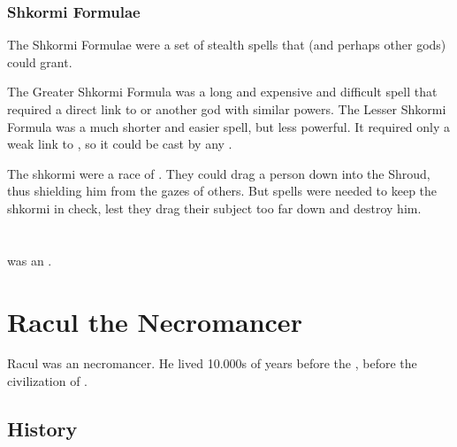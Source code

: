 \subsubsection{Shkormi Formulae}
The Shkormi Formulae were a set of stealth spells that \Nasshikerr (and perhaps other gods) could grant. 

The Greater Shkormi Formula was a long and expensive and difficult spell that required a direct link to \Nasshikerr or another god with similar powers.
The Lesser Shkormi Formula was a much shorter and easier spell, but less powerful. 
It required only a weak link to \Nasshikerr, so it could be cast by any \rethyax.

The shkormi were a race of \daemons.
They could drag a person down into the Shroud, thus shielding him from the gazes of others. 
But spells were needed to keep the shkormi in check, lest they drag their subject too far down and destroy him. 















\section{\NathRamos}
\index{\NathRamos}
\NathRamos was an \ophidian.















\section{Racul the Necromancer}
Racul was an \ophidian necromancer. 
He lived 10.000s of years before the , before the civilization of .









\subsection{History}





